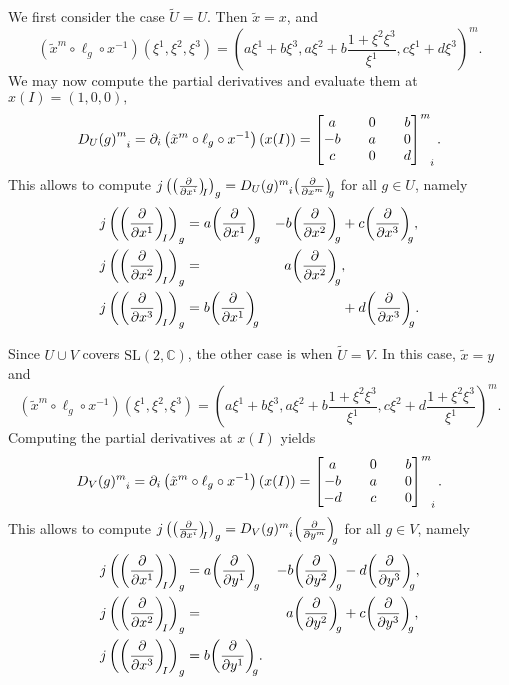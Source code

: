 We first consider the case \(\tilde{U} = U\). Then \(\tilde{x} = x\), and
\begin{equation*}
        \left(\tilde{x}^m \circ \ell_g \circ x^{-1}\right)(\xi^1,\xi^2,\xi^3) = \left(a\xi^1 + b\xi^3 , a\xi^2 + b\frac{1 + \xi^2\xi^3}{\xi^1}, c\xi^1 + d\xi^3\right)^m.
\end{equation*}
We may now compute the partial derivatives and evaluate them at \(x(I) = (1,0,0),\)
\begin{equation*}
    {D_{U}(g)}\indices{^m_i} = \partial_i\left(\tilde{x}^m \circ \ell_g \circ x^{-1}\right)(x(I)) = \begin{bmatrix}
    a && 0 && b\\
    -b && a && 0\\
    c && 0 && d
\end{bmatrix}\indices{^m_i}.
\end{equation*}
This allows to compute \(j\left(\bvec{x^i}{I}\right)_g = {D_{U}}(g)\indices{^m_i}\bvec{x^m}{g}\) for all \(g \in U\), namely
\begin{equation*}
    \begin{aligned}
        j\left(\bvec{x^1}{I}\right)_g &= a \bvec{x^1}{g} &- b \bvec{x^2}{g} &+ c \bvec{x^3}{g},\\
        j\left(\bvec{x^2}{I}\right)_g &=                 & a \bvec{x^2}{g}  &,\\
        j\left(\bvec{x^3}{I}\right)_g &= b \bvec{x^1}{g} &                  &+ d\bvec{x^3}{g}.
    \end{aligned}
\end{equation*}

Since \(U\cup V\) covers \(\mathrm{SL}(2,\mathbb{C})\), the other case is when \(\tilde{U} = V\). In this case, \(\tilde{x} = y\) and
\begin{equation*}
    \left(\tilde{x}^m \circ \ell_g \circ x^{-1}\right)(\xi^1,\xi^2,\xi^3) = \left(a\xi^1 + b\xi^3 , a\xi^2 + b\frac{1 + \xi^2\xi^3}{\xi^1}, c\xi^2 + d\frac{1 + \xi^2\xi^3}{\xi^1}\right)^m.
\end{equation*}
Computing the partial derivatives at \(x(I)\) yields
\begin{equation*}
    {D_V}(g)\indices{^m_i} = \partial_i\left(\tilde{x}^m \circ \ell_g \circ x^{-1}\right)(x(I)) = \begin{bmatrix}
    a && 0 && b\\
    -b && a && 0\\
    -d && c && 0
\end{bmatrix}\indices{^m_i}.
\end{equation*}
This allows to compute \(j\left(\bvec{x^i}{I}\right)_g = {D_V}(g)\indices{^m_i}\bvec{y^m}{g}\) for all \(g \in V\), namely
\begin{equation*}
    \begin{aligned}
        j\left(\bvec{x^1}{I}\right)_g &= a \bvec{y^1}{g} &- b \bvec{y^2}{g} &- d \bvec{y^3}{g},\\
        j\left(\bvec{x^2}{I}\right)_g &=                 & a \bvec{y^2}{g}  &+ c \bvec{y^3}{g},\\
        j\left(\bvec{x^3}{I}\right)_g &= b \bvec{y^1}{g}.&                  &
    \end{aligned}
\end{equation*}

